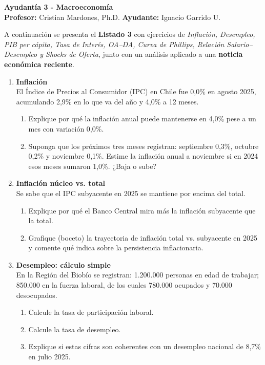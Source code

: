 \documentclass[11pt,addpoints]{article}
\begin{document}
\vspace*{0.05cm}

\begin{center}
{\Large \bfseries Ayudantía 3 - Macroeconomía\\[0.5cm]}
\textbf{Profesor:} Cristian Mardones, Ph.D. \quad \textbf{Ayudante:} Ignacio Garrido U.
\end{center}




A continuación se presenta el \textbf{Listado 3} con ejercicios de \textit{Inflación, Desempleo, PIB per cápita, Tasa de Interés, OA--DA, Curva de Phillips, Relación Salario--Desempleo y Shocks de Oferta}, junto con un análisis aplicado a una \textbf{noticia económica reciente}.

\begin{enumerate}

\item \textbf{Inflación}\\
El Índice de Precios al Consumidor (IPC) en Chile fue 0,0\% en agosto 2025, acumulando 2,9\% en lo que va del año y 4,0\% a 12 meses.
\begin{enumerate}[label=(\alph*)]
\item Explique por qué la inflación anual puede mantenerse en 4,0\% pese a un mes con variación 0,0\%.
\item Suponga que los próximos tres meses registran: septiembre 0,3\%, octubre 0,2\% y noviembre 0,1\%. Estime la inflación anual a noviembre si en 2024 esos meses sumaron 1,0\%. ¿Baja o sube?
\end{enumerate}

\item \textbf{Inflación núcleo vs. total}\\
Se sabe que el IPC subyacente en 2025 se mantiene por encima del total.
\begin{enumerate}[label=(\alph*)]
\item Explique por qué el Banco Central mira más la inflación subyacente que la total.
\item Grafique (boceto) la trayectoria de inflación total vs. subyacente en 2025 y comente qué indica sobre la persistencia inflacionaria.
\end{enumerate}

\item \textbf{Desempleo: cálculo simple}\\
En la Región del Biobío se registran: 1.200.000 personas en edad de trabajar; 850.000 en la fuerza laboral, de los cuales 780.000 ocupados y 70.000 desocupados.
\begin{enumerate}[label=(\alph*)]
\item Calcule la tasa de participación laboral.
\item Calcule la tasa de desempleo.
\item Explique si estas cifras son coherentes con un desempleo nacional de 8,7\% en julio 2025.
\end{enumerate}


\end{enumerate}
\end{document}
